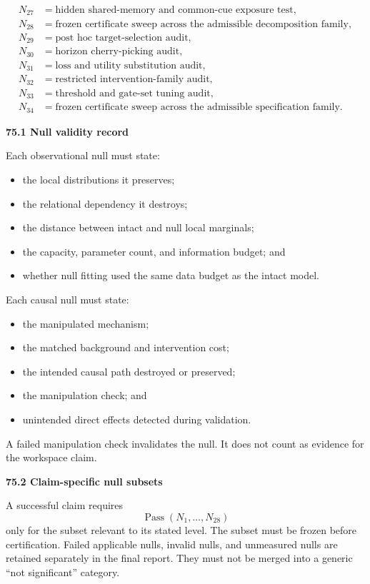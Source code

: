 \documentclass[11pt,letterpaper]{article}
\newcommand{\Pass}{\operatorname{Pass}}
\newcommand{\subtopic}[1]{%
 \vspace{0.45em}
 {\bfseries\color{AccentColor} #1\par}
}
\theoremstyle{plain}
\theoremstyle{definition}
\begin{document}
\[\begin{aligned}
N_{27}&=\text{hidden shared-memory and common-cue exposure test},\\
N_{28}&=\text{frozen certificate sweep across the admissible decomposition family},\\
N_{29}&=\text{post hoc target-selection audit},\\
N_{30}&=\text{horizon cherry-picking audit},\\
N_{31}&=\text{loss and utility substitution audit},\\
N_{32}&=\text{restricted intervention-family audit},\\
N_{33}&=\text{threshold and gate-set tuning audit},\\
N_{34}&=\text{frozen certificate sweep across the admissible specification family}.
\end{aligned}
\]

\subtopic{75.1 Null validity record}

Each observational null must state:
\begin{itemize}
\item the local distributions it preserves;
\item the relational dependency it destroys;
\item the distance between intact and null local marginals;
\item the capacity, parameter count, and information budget; and
\item whether null fitting used the same data budget as the intact model.
\end{itemize}
Each causal null must state:
\begin{itemize}
\item the manipulated mechanism;
\item the matched background and intervention cost;
\item the intended causal path destroyed or preserved;
\item the manipulation check; and
\item unintended direct effects detected during validation.
\end{itemize}
A failed manipulation check invalidates the null. It does not count as evidence
for the workspace claim.

\subtopic{75.2 Claim-specific null subsets}

A successful claim requires
\[
\Pass(N_1,\ldots,N_{28})
\]
only for the subset relevant to its stated level. The subset must be frozen
before certification. Failed applicable nulls, invalid nulls, and unmeasured
nulls are retained separately in the final report. They must not be merged
into a generic ``not significant'' category.
\end{document}
